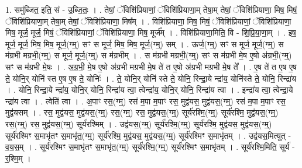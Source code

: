 \documentclass[17pt]{extarticle}
\begin{document}
1. समु॑ब्जित॒ इति॒ सं - उ॒ब्जि॒तः॒ । . तेषां॒ ॅविशि॑प्रियाणां॒ ॅविशि॑प्रियाणा॒म् तेषा॒म् तेषां॒ ॅविशि॑प्रियाणा॒ मिष॒ मिषं॒ ॅविशि॑प्रियाणा॒म् तेषा॒म् तेषां॒ ॅविशि॑प्रियाणा॒ मिष᳚म् । . विशि॑प्रियाणा॒ मिष॒ मिषं॒ ॅविशि॑प्रियाणां॒ ॅविशि॑प्रियाणा॒ मिष॒ मूर्ज॒ मूर्ज॒ मिषं॒ ॅविशि॑प्रियाणां॒ ॅविशि॑प्रियाणा॒ मिष॒ मूर्ज᳚म् । . विशि॑प्रियाणा॒मिति॒ वि - शि॒प्रि॒या॒णा॒म् । . इष॒ मूर्ज॒ मूर्ज॒ मिष॒ मिष॒ मूर्ज॒(ग्म्॒) सꣳ स मूर्ज॒ मिष॒ मिष॒ मूर्ज॒(ग्म्॒) सम् । . ऊर्ज॒(ग्म्॒) सꣳ स मूर्ज॒ मूर्ज॒(ग्म्॒) स म॑ग्रभी मग्रभी॒(ग्म्॒) स मूर्ज॒ मूर्ज॒(ग्म्॒) स म॑ग्रभीम् । . स म॑ग्रभी मग्रभी॒(ग्म्॒) सꣳ स म॑ग्रभी मे॒ष ए॒षो अ॑ग्रभी॒(ग्म्॒) सꣳ स म॑ग्रभी मे॒षः । . अ॒ग्र॒भी॒ मे॒ष ए॒षो अ॑ग्रभी मग्रभी मे॒ष ते॑ त ए॒षो अ॑ग्रभी मग्रभी मे॒ष ते᳚ । . ए॒ष ते॑ त ए॒ष ए॒ष ते॒ योनि॒र् योनि॑ स्त ए॒ष ए॒ष ते॒ योनिः॑ । . ते॒ योनि॒र् योनि॑ स्ते ते॒ योनि॒ रिन्द्रा॒ये न्द्रा॑य॒ योनि॑स्ते ते॒ योनि॒ रिन्द्रा॑य । . योनि॒ रिन्द्रा॒ये न्द्रा॑य॒ योनि॒र् योनि॒ रिन्द्रा॑य त्वा॒ त्वेन्द्रा॑य॒ योनि॒र् योनि॒ रिन्द्रा॑य त्वा । . इन्द्रा॑य त्वा॒ त्वेन्द्रा॒ये न्द्रा॑य त्वा । . त्वेति॑ त्वा । . अ॒पाꣳ रस॒(ग्म्॒) रस॑ म॒पा म॒पाꣳ रस॒ मुद्व॑यस॒ मुद्व॑यस॒(ग्म्॒) रस॑ म॒पा म॒पाꣳ रस॒ मुद्व॑यसम् । . रस॒ मुद्व॑यस॒ मुद्व॑यस॒(ग्म्॒) रस॒(ग्म्॒) रस॒ मुद्व॑यस॒(ग्म्॒) सूर्य॑रश्मि॒(ग्म्॒) सूर्य॑रश्मि॒ मुद्व॑यस॒(ग्म्॒) रस॒(ग्म्॒) रस॒ मुद्व॑यस॒(ग्म्॒) सूर्य॑रश्मिम् । . उद्व॑यस॒(ग्म्॒) सूर्य॑रश्मि॒(ग्म्॒) सूर्य॑रश्मि॒ मुद्व॑यस॒ मुद्व॑यस॒(ग्म्॒) सूर्य॑रश्मिꣳ स॒माभृ॑तꣳ स॒माभृ॑त॒(ग्म्॒) सूर्य॑रश्मि॒ मुद्व॑यस॒ मुद्व॑यस॒(ग्म्॒) सूर्य॑रश्मिꣳ स॒माभृ॑तम् । . उद्व॑यस॒मित्युत् - व॒य॒स॒म् । . सूर्य॑रश्मिꣳ स॒माभृ॑तꣳ स॒माभृ॑त॒(ग्म्॒) सूर्य॑रश्मि॒(ग्म्॒) सूर्य॑रश्मिꣳ स॒माभृ॑तम् । . सूर्य॑रश्मि॒मिति॒ सूर्य॑ - र॒श्मि॒म् । \newline
\end{document}
